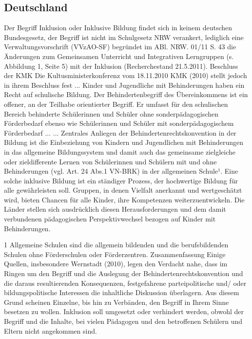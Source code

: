 \subsection{Deutschland}
Der Begriff Inklusion oder Inklusive Bildung findet sich in keinem deutschen Bundesgesetz, der Begriff ist nicht im Schulgesetz NRW verankert, lediglich eine Verwaltungsvorschrift 
(VVzAO-SF) begründet im ABl. NRW. 01/11 S. 43 die Änderungen zum Gemeinsamen Un­terricht und Integrativen Lerngruppen (s. Abbildung 1, Seite 5) mit der Inklusion 
(Recherchestand 21.5.2011). 
Beschluss der KMK
Die Kultusministerkonferenz vom 18.11.2010 KMK (2010) stellt jedoch in ihrem Beschluss fest
...
Kinder und Jugendliche mit Behinderungen haben ein Recht auf schulische Bildung. Der Behindertenbegriff des Übereinkommens ist ein offener, an der Teilhabe orien­tierter Begriff. Er umfasst für den schulischen Bereich behinderte Schülerinnen und Schüler ohne sonder­päda­go­gischen Förderbedarf ebenso wie Schülerinnen und Schüler mit sonderpädagogischem Förderbedarf ...
...
Zentrales Anliegen der Behindertenrechtskonvention in der Bildung ist die Einbeziehung von Kindern und Jugend­lichen mit Behinderungen in das allgemeine Bildungs­system und damit auch das gemeinsame ziel­gleiche oder zieldifferente Lernen von Schülerinnen und Schülern mit und ohne Behinderungen (vgl. Art. 24 Abs.1 VN-BRK) in der allgemeinen Schule¹. Eine solche inklusive Bildung ist ein ständiger Prozess, der hochwertige Bildung für alle gewährleisten soll. Gruppen, in denen Vielfalt anerkannt und wertgeschätzt wird, bieten Chancen für alle Kinder, ihre Kompetenzen weiterzuentwickeln. Die Länder stellen sich ausdrücklich diesen Herausforderungen und dem damit verbundenen pädagogischen Perspektivwechsel 
bezogen auf Kinder mit Behinderungen. 

1 Allgemeine Schulen sind die allgemein bildenden und die berufsbildenden Schulen ohne Förderschulen oder Förderzentren. 
Zusammenfassung
Einige Quellen, insbesondere Wernstadt (2010), legen den Verdacht nahe, dass im Ringen um den Begriff und die Auslegung der Behinderten­rechtskonvention und die daraus resultierenden Konsequenzen, festgefahrene parteipolitische und/ oder bildungspolitische Interessen die in­haltliche Diskussion überlagern. Aus diesem Grund scheinen Einzelne, bis hin zu Verbänden, den Begriff in Ihrem Sinne besetzen zu wollen.
Inklusion soll umgesetzt oder verhindert werden, obwohl der Be­griff und die Inhalte, bei vielen Pädagogen und den betroffenen Schülern und Eltern nicht an­ge­kommen sind.

